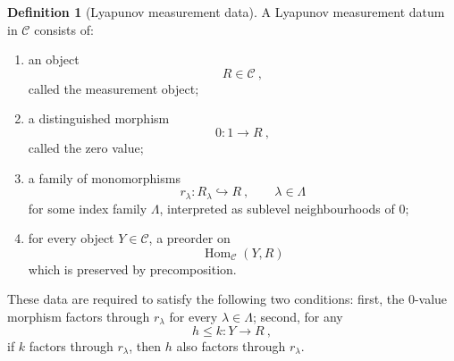 \documentclass[a4paper,reqno,oneside]{amsart}
\theoremstyle{definition}
\newtheorem{definition}[theorem]{Definition}
\theoremstyle{remark}
\numberwithin{equation}{section}
\begin{document}
\begin{definition}[Lyapunov measurement data]\label{def: lyapunov measurement}
A Lyapunov
measurement datum in $\mathcal C$ consists of:

\begin{enumerate}
    \item an object
    \begin{equation}
        R\in\mathcal C \ ,
    \end{equation}
    called the measurement object;

    \item a distinguished morphism
    \begin{equation}
        0\colon 1\to R \ ,
    \end{equation}
    called the zero value;

    \item a family of monomorphisms
    \begin{equation}
        r_\lambda\colon R_\lambda\hookrightarrow R \ ,
        \qquad \lambda\in\Lambda
    \end{equation}
    for some index family $\Lambda$, interpreted as sublevel neighbourhoods of $0$;

    \item for every object $Y\in\mathcal C$, a preorder on
    \begin{equation}
        \operatorname{Hom}_{\mathcal C}(Y,R)
    \end{equation}
    which is preserved by precomposition.
\end{enumerate}
These data are required to satisfy the following two conditions: first, the 0-value morphism factors through $r_\lambda$ for every $\lambda \in \Lambda$; second, for any
\begin{equation}
    h\leq k\colon Y\to R \ ,
\end{equation}
if $k$ factors through $r_\lambda$, then $h$ also factors through $r_\lambda$.
\end{definition}
\end{document}
